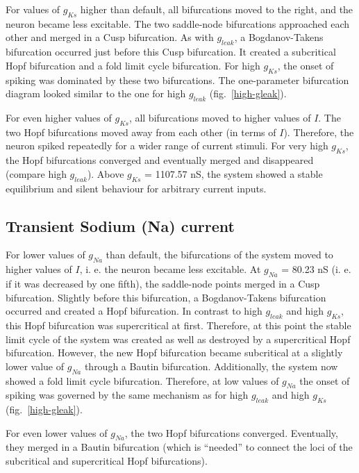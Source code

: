 \documentclass[12pt,a4paper,]{report}
\begin{document}
For values of $g_{Ks}$ higher than default, all bifurcations moved to
the right, and the neuron became less excitable. The two saddle-node
bifurcations approached each other and merged in a Cusp bifurcation. As
with $g_{leak}$, a Bogdanov-Takens bifurcation occurred just before this
Cusp bifurcation. It created a subcritical Hopf bifurcation and a fold
limit cycle bifurcation. For high $g_{Ks}$, the onset of spiking was
dominated by these two bifurcations. The one-parameter bifurcation
diagram looked similar to the one for high $g_{leak}$
(fig.~\ref{high-gleak}).

For even higher values of $g_{Ks}$, all bifurcations moved to higher
values of $I$. The two Hopf bifurcations moved away from each other (in
terms of $I$). Therefore, the neuron spiked repeatedly for a wider range
of current stimuli. For very high $g_{Ks}$, the Hopf bifurcations
converged and eventually merged and disappeared (compare high
$g_{leak}$). Above $g_{Ks}$ = 1107.57 nS, the system showed a stable
equilibrium and silent behaviour for arbitrary current inputs.

\subsection{Transient Sodium (Na)
current}\label{transient-sodium-na-current}

For lower values of $g_{Na}$ than default, the bifurcations of the
system moved to higher values of $I$, i. e. the neuron became less
excitable. At $g_{Na}$ = 80.23 nS (i. e. if it was decreased by one
fifth), the saddle-node points merged in a Cusp bifurcation. Slightly
before this bifurcation, a Bogdanov-Takens bifurcation occurred and
created a Hopf bifurcation. In contrast to high $g_{leak}$ and high
$g_{Ks}$, this Hopf bifurcation was supercritical at first. Therefore,
at this point the stable limit cycle of the system was created as well
as destroyed by a supercritical Hopf bifurcation. However, the new Hopf
bifurcation became subcritical at a slightly lower value of $g_{Na}$
through a Bautin bifurcation. Additionally, the system now showed a fold
limit cycle bifurcation. Therefore, at low values of $g_{Na}$ the onset
of spiking was governed by the same mechanism as for high $g_{leak}$ and
high $g_{Ks}$ (fig.~\ref{high-gleak}).

For even lower values of $g_{Na}$, the two Hopf bifurcations converged.
Eventually, they merged in a Bautin bifurcation (which is ``needed'' to
connect the loci of the subcritical and supercritical Hopf
bifurcations).
\end{document}
